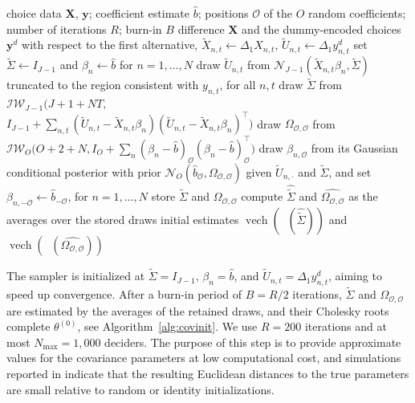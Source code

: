 \documentclass[preprint,12pt,authoryear]{elsarticle}
\newcommand{\Normal}[2]{\mathcal{N}_{#1}\left(#2 \right)}
\newcommand{\Oset}{{\mathcal O}}
\DeclareMathOperator*{\vech}{vech}
\DeclareMathOperator*{\chol}{chol^\ast}
\begin{document}
\begin{algorithm}[htbp]
  \caption{Initial estimates for $\tilde{\Sigma} = \Delta_1 \Sigma \Delta_1^\top$ and $\Omega$.}
  \label{alg:covinit}
  \begin{algorithmic}[1]
    \REQUIRE choice data $\bm{X}$, $\bm{y}$; coefficient estimate $\hat{b}$; positions $\Oset$ of the $O$ random coefficients; number of iterations $R$; burn-in $B$
    \STATE difference $\bm{X}$ and the dummy-encoded choices $\bm{y}^d$ with respect to the first alternative, $\tilde{X}_{n,t} \leftarrow \Delta_1 X_{n,t}$, $\tilde{U}_{n,t} \leftarrow \Delta_1 y^d_{n,t}$
    \STATE set $\tilde{\Sigma} \leftarrow I_{J-1}$ and $\beta_n \leftarrow \hat{b}$ for $n = 1,\dots,N$
      \STATE draw $\tilde{U}_{n,t}$ from $\Normal{J-1}{\tilde{X}_{n,t} \beta_n, \tilde{\Sigma}}$ truncated to the region consistent with $y_{n,t}$, for all $n, t$
      \STATE draw $\tilde{\Sigma}$ from $\mathcal{IW}_{J-1}\bigl(J + 1 + NT,$\\ \hspace*{1.5em}$I_{J-1} + \sum_{n,t} (\tilde{U}_{n,t} - \tilde{X}_{n,t} \beta_n)(\tilde{U}_{n,t} - \tilde{X}_{n,t} \beta_n)^\top\bigr)$
        \STATE draw $\Omega_{\Oset,\Oset}$ from $\mathcal{IW}_{O}\bigl(O + 2 + N, I_{O} + \sum_{n} (\beta_{n} - \hat{b})_{\Oset} (\beta_{n} - \hat{b})_{\Oset}^\top\bigr)$
        \STATE draw $\beta_{n,\Oset}$ from its Gaussian conditional posterior with prior $\Normal{O}{\hat{b}_{\Oset}, \Omega_{\Oset,\Oset}}$ given $\tilde{U}_{n,\cdot}$ and $\tilde{\Sigma}$, and set $\beta_{n,-\Oset} \leftarrow \hat{b}_{-\Oset}$, for ${n = 1,\dots,N}$
      \ENDIF
        \STATE store $\tilde{\Sigma}$ and $\Omega_{\Oset,\Oset}$
      \ENDIF
    \ENDFOR
    \STATE compute $\widehat{\tilde{\Sigma}}$ and $\widehat{\Omega_{\Oset,\Oset}}$ as the averages over the stored draws
    \ENSURE initial estimates $\vech(\chol(\widehat{\tilde{\Sigma}}))$ and $\vech(\chol(\widehat{\Omega_{\Oset,\Oset}}))$
  \end{algorithmic}
\end{algorithm}
%
The sampler is initialized at $\tilde{\Sigma} = I_{J-1}$, $\beta_n = \hat{b}$, and $\tilde{U}_{n,t} = \Delta_1 y^d_{n,t}$, aiming to speed up convergence. After a burn-in period of $B = R/2$ iterations, $\tilde{\Sigma}$ and $\Omega_{\Oset,\Oset}$ are estimated by the averages of the retained draws, and their Cholesky roots complete $\theta^{(0)}$, see Algorithm~\ref{alg:covinit}. We use $R = 200$ iterations and at most $N_{\max} = 1{,}000$ deciders. The purpose of this step is to provide approximate values for the covariance parameters at low computational cost, and simulations reported in \citet[Appendix C]{Oelschlaeger2026} indicate that the resulting Euclidean distances to the true parameters are small relative to random or identity initializations.
\end{document}
